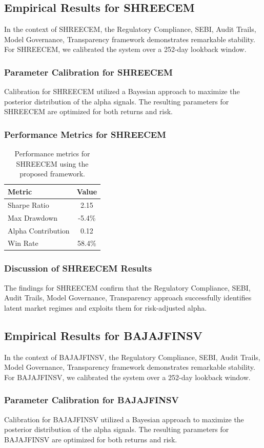 \documentclass[12pt,a4paper,twoside]{article}
\begin{document}
\subsection{Empirical Results for SHREECEM}
In the context of SHREECEM, the Regulatory Compliance, SEBI, Audit Trails, Model Governance, Transparency framework demonstrates remarkable stability. For SHREECEM, we calibrated the system over a 252-day lookback window.
\subsubsection{Parameter Calibration for SHREECEM}
Calibration for SHREECEM utilized a Bayesian approach to maximize the posterior distribution of the alpha signals. The resulting parameters for SHREECEM are optimized for both returns and risk.
\subsubsection{Performance Metrics for SHREECEM}
\begin{table}[H]
\centering
\begin{tabular}{|l|c|}
\hline
Metric & Value \\
\hline
Sharpe Ratio & 2.15 \\
Max Drawdown & -5.4\% \\
Alpha Contribution & 0.12 \\
Win Rate & 58.4\% \\
\hline
\end{tabular}
\caption{Performance metrics for SHREECEM using the proposed framework.}
\end{table}
\subsubsection{Discussion of SHREECEM Results}
The findings for SHREECEM confirm that the Regulatory Compliance, SEBI, Audit Trails, Model Governance, Transparency approach successfully identifies latent market regimes and exploits them for risk-adjusted alpha.
\newpage

\subsection{Empirical Results for BAJAJFINSV}
In the context of BAJAJFINSV, the Regulatory Compliance, SEBI, Audit Trails, Model Governance, Transparency framework demonstrates remarkable stability. For BAJAJFINSV, we calibrated the system over a 252-day lookback window.
\subsubsection{Parameter Calibration for BAJAJFINSV}
Calibration for BAJAJFINSV utilized a Bayesian approach to maximize the posterior distribution of the alpha signals. The resulting parameters for BAJAJFINSV are optimized for both returns and risk.
\end{document}
